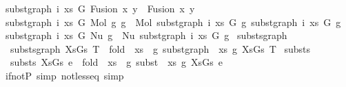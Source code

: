 \begin{isabellebody}
{\isacharbar}{\kern0pt}\ {\isachardoublequoteopen}subst{\isacharunderscore}{\kern0pt}graph\ i\ xs\ G\ {\isacharparenleft}{\kern0pt}Fusion\ x\ y{\isacharparenright}{\kern0pt}\ {\isacharequal}{\kern0pt}\ Fusion\ x\ y{\isachardoublequoteclose}\isanewline
{\isacharbar}{\kern0pt}\ {\isachardoublequoteopen}subst{\isacharunderscore}{\kern0pt}graph\ i\ xs\ G\ {\isacharparenleft}{\kern0pt}Mol\ g{}\ g{}{\isacharparenright}{\kern0pt}\ {\isacharequal}{\kern0pt}\ Mol\ {\isacharparenleft}{\kern0pt}subst{\isacharunderscore}{\kern0pt}graph\ i\ xs\ G\ g{}{\isacharparenright}{\kern0pt}\ {\isacharparenleft}{\kern0pt}subst{\isacharunderscore}{\kern0pt}graph\ i\ xs\ G\ g{}{\isacharparenright}{\kern0pt}{\isachardoublequoteclose}\isanewline
{\isacharbar}{\kern0pt}\ {\isachardoublequoteopen}subst{\isacharunderscore}{\kern0pt}graph\ i\ xs\ G\ {\isacharparenleft}{\kern0pt}Nu\ g{\isacharparenright}{\kern0pt}\ {\isacharequal}{\kern0pt}\ Nu\ {\isacharparenleft}{\kern0pt}subst{\isacharunderscore}{\kern0pt}graph\ i\ xs\ G\ g{\isacharparenright}{\kern0pt}{\isachardoublequoteclose}\isanewline
\isanewline
\isanewline
{}\isamarkupfalse%
\ substs{\isacharunderscore}{\kern0pt}graph{\isacharcolon}{\kern0pt}\isanewline
\ \ {\isachardoublequoteopen}substs{\isacharunderscore}{\kern0pt}graph\ XsGs\ T\ {\isacharequal}{\kern0pt}\ fold\ {\isacharparenleft}{\kern0pt}{\isasymlambda}\ {\isacharparenleft}{\kern0pt}{\isacharparenleft}{\kern0pt}xs{\isacharcomma}{\kern0pt}\ {\isacharunderscore}{\kern0pt}{\isacharparenright}{\kern0pt}{\isacharcomma}{\kern0pt}\ g{\isacharparenright}{\kern0pt}{\isachardot}{\kern0pt}\ subst{\isacharunderscore}{\kern0pt}graph\ {}\ xs\ g{\isacharparenright}{\kern0pt}\ XsGs\ T{\isachardoublequoteclose}\isanewline
\isanewline
{}\isamarkupfalse%
\ substs{\isacharcolon}{\kern0pt}\isanewline
\ \ {\isachardoublequoteopen}substs\ XsGs\ e\ {\isacharequal}{\kern0pt}\ fold\ {\isacharparenleft}{\kern0pt}{\isasymlambda}\ {\isacharparenleft}{\kern0pt}{\isacharparenleft}{\kern0pt}xs{\isacharcomma}{\kern0pt}\ {\isacharunderscore}{\kern0pt}{\isacharparenright}{\kern0pt}{\isacharcomma}{\kern0pt}\ g{\isacharparenright}{\kern0pt}{\isachardot}{\kern0pt}\ subst\ {}\ xs\ g{\isacharparenright}{\kern0pt}\ XsGs\ e{\isachardoublequoteclose}\isanewline
\isanewline
\isanewline
\isanewline
\isanewline
\isanewline
{}\isamarkupfalse%
\ if{\isacharunderscore}{\kern0pt}not{\isacharunderscore}{\kern0pt}P\ {\isacharbrackleft}{\kern0pt}simp{\isacharbrackright}{\kern0pt}\ not{\isacharunderscore}{\kern0pt}less{\isacharunderscore}{\kern0pt}eq\ {\isacharbrackleft}{\kern0pt}simp{\isacharbrackright}{\kern0pt}\isanewline

\end{isabellebody}
